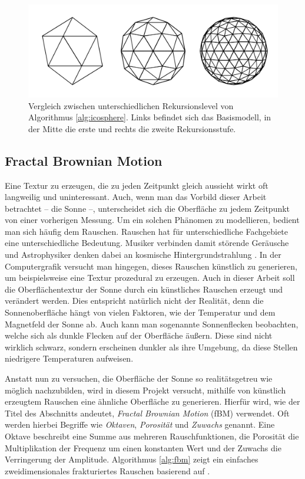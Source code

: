 \begin{figure}
  \includegraphics[width=\columnwidth]{icosphere-algorithm}
  \caption{Vergleich zwischen unterschiedlichen Rekursionslevel von Algorithmus \ref{alg:icosphere}. Links befindet sich das Basismodell, in der Mitte die erste und rechts die zweite Rekursionsstufe.}
  \label{fig:icosphere-levels}
  \Description[]{}
\end{figure}

\subsection{Fractal Brownian Motion}
Eine Textur zu erzeugen, die zu jeden Zeitpunkt gleich aussieht wirkt oft
langweilig und uninteressant. Auch, wenn man das Vorbild dieser Arbeit
betrachtet -- die Sonne --, unterscheidet sich die Oberfläche zu jedem
Zeitpunkt von einer vorherigen Messung. Um ein solchen Phänomen zu
modellieren, bedient man sich häufig dem Rauschen. Rauschen hat für
unterschiedliche Fachgebiete eine unterschiedliche Bedeutung. Musiker
verbinden damit störende Geräusche und Astrophysiker denken dabei an
kosmische Hintergrundstrahlung \cite{bookofshaders}. In der Computergrafik
versucht man hingegen, dieses Rauschen künstlich zu generieren, um
beispielsweise eine Textur prozedural zu erzeugen. Auch in dieser Arbeit soll
die Oberflächentextur der Sonne durch ein künstliches Rauschen erzeugt und
verändert werden. Dies entspricht natürlich nicht der Realität, denn die
Sonnenoberfläche hängt von vielen Faktoren, wie der Temperatur und dem
Magnetfeld der Sonne ab. Auch kann man sogenannte Sonnenflecken beobachten,
welche sich als dunkle Flecken auf der Oberfläche äußern. Diese sind nicht
wirklich schwarz, sondern erscheinen dunkler als ihre Umgebung, da diese
Stellen niedrigere Temperaturen aufweisen.

Anstatt nun zu versuchen, die Oberfläche der Sonne so realitätsgetreu wie
möglich nachzubilden, wird in diesem Projekt versucht, mithilfe von künstlich
erzeugtem Rauschen eine ähnliche Oberfläche zu generieren. Hierfür wird, wie
der Titel des Abschnitts andeutet, \textit{Fractal Brownian Motion} (fBM) verwendet.
Oft werden hierbei Begriffe wie \textit{Oktaven}, \textit{Porosität} und
\textit{Zuwachs} genannt. Eine Oktave beschreibt eine Summe aus mehreren
Rauschfunktionen, die Porosität die Multiplikation der Frequenz um einen konstanten
Wert und der Zuwachs die Verringerung der Amplitude. Algorithmus \ref{alg:fbm} zeigt
ein einfaches zweidimensionales frakturiertes Rauschen basierend auf \cite{bookofshaders}.

